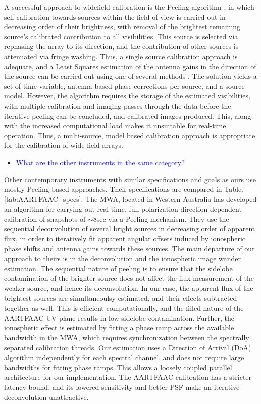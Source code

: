 \documentclass{aa}
\begin{document}
A successful approach to widefield calibration is the Peeling algorithm
\cite{noordam2004peel,vdTol2007selfcallofar}, in which self-calibration
towards sources within the field of view is carried out in decreasing
order of their brightness, with removal of the brightest remaining
source's calibrated contribution to all visibilities. This source
is selected via rephasing the array to its direction, and the contribution
of other sources is attenuated via fringe washing. Thus, a single
source calibration approach is adequate, and a Least Squares estimation
of the antenna gains in the direction of the source can be carried
out using one of several methods \cite{boonstra2003gain}. The solution
yields a set of time-variable, antenna based phase corrections per
source, and a source model. However, the algorithm requires the storage
of the estimated visibilities, with multiple calibration and imaging
passes through the data before the iterative peeling can be concluded,
and calibrated images produced. This, along with the increased computational
load makes it unsuitable for real-time operation. Thus, a multi-source,
model based calibration approach is appropriate for the calibration
of wide-field arrays. 
\begin{itemize}
\item \textcolor{blue}{What are the other instruments in the same category?}
\end{itemize}
Other contemporary instruments with similar specifications and goals
as ours use mostly Peeling based approaches. Their specifications
are compared in Table. \ref{tab:AARTFAAC_specs}. The MWA\cite{lonsdale2009murchison},
located in Western Australia has developed an algorithm for carrying
out real-time, full polarization direction dependent calibration of
snapshots of $\sim$8sec via a Peeling mechanism\cite{mitchell2008real}.
They use the sequential deconvolution of several bright sources in
decreasing order of apparent flux, in order to iteratively fit apparent
angular offsets induced by ionospheric phase shifts and antenna gains
towards these sources. The main departure of our approach to theirs
is in the deconvolution and the ionospheric image wander estimation.
The sequential nature of peeling is to ensure that the sidelobe contamination
of the brighter source does not affect the flux measurement of the
weaker source, and hence its deconvolution. In our case, the apparent
flux of the brightest sources are simultaneoulsy estimated, and their
effects subtracted together as well. This is efficient computationally,
and the filled nature of the AARTFAAC UV plane results in low sidelobe
contamination. Further, the ionospheric effect is estimated by fitting
a phase ramp across the available bandwidth in the MWA, which requires
synchronization between the spectrally separated calibration threads.
Our estimation uses a Direction of Arrival (DoA) algorithm independently
for each spectral channel, and does not require large bandwidths for
fitting phase ramps. This allows a loosely coupled parallel architecture
for our implementation. The AARTFAAC calibration has a stricter latency
bound, and its lowered sensitivity and better PSF make an iterative
deconvolution unattractive.
\end{document}

